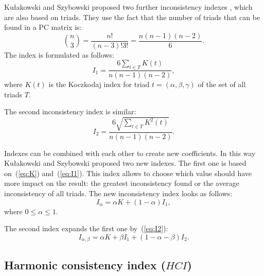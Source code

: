 Kułakowski and Szybowski proposed two further inconsistency indexes \cite{KULAKOWSKI20141}, which are also based on triads. They use the fact that the number of triads that can be found in a PC matrix is:
	\begin{equation} 
		\label{eq:nPo3}
		\binom{n}{3}=\frac{n!}{(n-3)!3!}=\frac{n(n-1)(n-2)}{6}.
	 \end{equation}
 The index is formulated as follows:
	 \begin{equation} 
	 \label{eq:I1}		
		I_{1}=\frac{6\sum_{t\in T}K(t)}{n(n-1)(n-2)},
	 \end{equation}
 where $K(t)$ is the Koczkodaj index for triad $t=(\alpha,\beta,\gamma)$ of the set of all triads $T$. 

The second inconsistency index is similar:
	\begin{equation} 
	 \label{eq:I2}				
		I_{2}=\frac{6\sqrt{\sum_{t\in T}K^{2}(t)}}{n(n-1)(n-2)}.
	 \end{equation}

Indexes can be combined with each other to create new coefficients. In this way Kułakowski and Szybowski proposed two new indexes. The first one is based on~(\ref{eq:K}) and~(\ref{eq:I1}). This index allows to choose which value should have more impact on the result: the greatest inconsistency found or the average inconsistency of all triads. The new inconsistency index looks as follows:
	\begin{equation} 
		I_{\alpha}=\alpha K+(1-\alpha)I_{1},
	 \end{equation}
 where $0\leq\alpha\leq1$.
  
The second index expands the first one by~(\ref{eq:I2}):
	\begin{equation} 
		I_{\alpha,\beta}=\alpha K+\beta I_{1}+(1-\alpha-\beta)I_{2}.
	 \end{equation}
 

\subsection{Harmonic consistency index ($\textit{HCI}$)}

